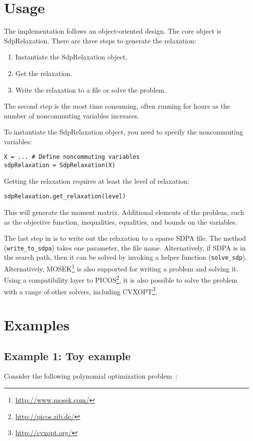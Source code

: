 \documentclass{article}
\begin{document}
\section{Usage}
The implementation follows an object-oriented design. The core object is SdpRelaxation. There are three steps to generate the relaxation:
\begin{enumerate}
  \item Instantiate the SdpRelaxation object.
  \item Get the relaxation.
  \item Write the relaxation to a file or solve the problem.
\end{enumerate}

The second step is the most time consuming, often running for hours as the number of noncommuting variables increases.

To instantiate the SdpRelaxation object, you need to specify the noncommuting variables:
\begin{verbatim}
X = ... # Define noncommuting variables
sdpRelaxation = SdpRelaxation(X)
\end{verbatim}

Getting the relaxation requires at least the level of relaxation:
\begin{verbatim}
sdpRelaxation.get_relaxation(level)
\end{verbatim}
This will generate the moment matrix. Additional elements of the problem, such as the objective function, inequalities, equalities, and bounds on the variables.

The last step in is to write out the relaxation to a sparse SDPA file. The method (\verb+write_to_sdpa+) takes one parameter, the file name. Alternatively, if SDPA is in the search path, then it can be solved by invoking a helper function (\verb+solve_sdp+). Alternatively, MOSEK\footnote{\url{http://www.mosek.com/}} is also supported for writing a problem and solving it. Using a compatibility layer to PICOS\footnote{\url{http://picos.zib.de/}}, it is also possible to solve the problem with a range of other solvers, including CVXOPT\footnote{\url{http://cvxopt.org/}}.

\section{Examples}
\subsection{Example 1: Toy example}\label{example1}
Consider the following polynomial optimization problem~\citep{pironio2010convergent}:
\end{document}
